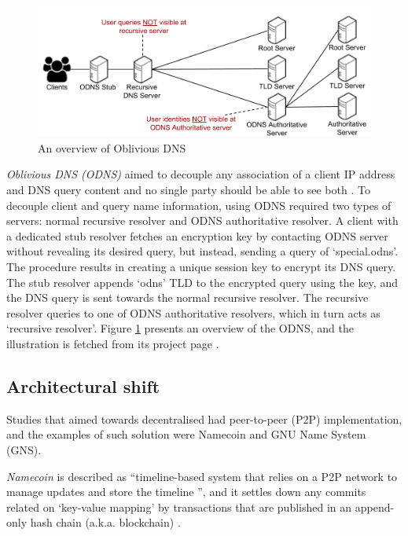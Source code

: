 \begin{figure}[h!]
    \begin{center}
    \includegraphics*[width=0.9\columnwidth]{img/ODNSoverview}
    \end{center}
    \caption{An overview of Oblivious DNS \cite{ODNSwebsite}}
    \label{odnsoverview}
\end{figure}
\textit{Oblivious DNS (ODNS)} aimed to decouple any association of a client IP address and DNS query content and no single party should be able to see both \cite{annee-dprive-oblivious-dns-00}.
To decouple client and query name information, using ODNS required two types of servers: normal recursive resolver and ODNS authoritative resolver.
A client with a dedicated stub resolver fetches an encryption key by contacting ODNS server without revealing its desired query, but instead, sending a query of `special.odns'.
The procedure results in creating a unique session key to encrypt its DNS query. The stub resolver appends `odns' TLD to the encrypted query using the key, and the DNS query is sent towards the normal recursive resolver. The recursive resolver queries to one of ODNS authoritative resolvers, which in turn acts as `recursive resolver'.
Figure \ref{odnsoverview} presents an overview of the ODNS, and the illustration is fetched from its project page \cite{ODNSwebsite}.

\subsection{Architectural shift}
Studies that aimed towards decentralised had peer-to-peer (P2P) implementation, and the examples of such solution were Namecoin and GNU Name System (GNS).

\textit{Namecoin} \cite{loibl2014namecoin} is described as ``timeline-based system that relies on a P2P network to manage updates and store the timeline \cite{grothoff2017nsa}'', and it settles down any commits related on `key-value mapping' by transactions that are published in an append-only hash chain (a.k.a. blockchain) \cite{kalodner2015empirical}.


